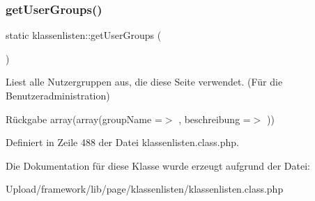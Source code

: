 \subsubsection{\texorpdfstring{get\+User\+Groups()}{getUserGroups()}}
{\footnotesize\ttfamily static klassenlisten\+::get\+User\+Groups (\begin{DoxyParamCaption}{ }\end{DoxyParamCaption})\hspace{0.3cm}{\ttfamily [static]}}

Liest alle Nutzergruppen aus, die diese Seite verwendet. (Für die Benutzeradministration) \begin{DoxyReturn}{Rückgabe}
array(array(\textquotesingle{}group\+Name\textquotesingle{} =$>$ \textquotesingle{}\textquotesingle{}, \textquotesingle{}beschreibung\textquotesingle{} =$>$ \textquotesingle{}\textquotesingle{})) 
\end{DoxyReturn}


Definiert in Zeile 488 der Datei klassenlisten.\+class.\+php.



Die Dokumentation für diese Klasse wurde erzeugt aufgrund der Datei\+:\begin{DoxyCompactItemize}
\item 
Upload/framework/lib/page/klassenlisten/klassenlisten.\+class.\+php\end{DoxyCompactItemize}
